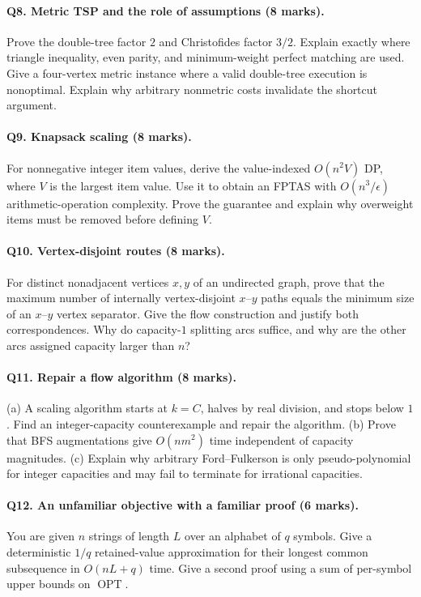 \documentclass[10pt]{article}
\theoremstyle{definition}
\newcommand{\OPT}{\operatorname{OPT}}
\begin{document}
\paragraph{Q8. Metric TSP and the role of assumptions (8 marks).}
Prove the double-tree factor $2$ and Christofides factor $3/2$.  Explain
exactly where triangle inequality, even parity, and minimum-weight perfect
matching are used.  Give a four-vertex metric instance where a valid
double-tree execution is nonoptimal.  Explain why arbitrary nonmetric
costs invalidate the shortcut argument.

\paragraph{Q9. Knapsack scaling (8 marks).}
For nonnegative integer item values, derive the value-indexed $O(n^2V)$ DP,
where $V$ is the largest item value.  Use it to obtain an FPTAS with
$O(n^3/\epsilon)$ arithmetic-operation complexity.  Prove the guarantee
and explain why overweight items must be removed before defining $V$.

\paragraph{Q10. Vertex-disjoint routes (8 marks).}
For distinct nonadjacent vertices $x,y$ of an undirected graph, prove that
the maximum number of internally vertex-disjoint $x$--$y$ paths equals
the minimum size of an $x$--$y$ vertex separator.  Give the flow construction
and justify both correspondences.  Why do capacity-$1$ splitting arcs
suffice, and why are the other arcs assigned capacity larger than $n$?

\paragraph{Q11. Repair a flow algorithm (8 marks).}
(a) A scaling algorithm starts at $k=C$, halves by real division, and stops
below $1$.  Find an integer-capacity counterexample and repair the algorithm.
(b) Prove that BFS augmentations give $O(nm^2)$ time independent of capacity
magnitudes.  (c) Explain why arbitrary Ford--Fulkerson is only
pseudo-polynomial for integer capacities and may fail to terminate for
irrational capacities.

\paragraph{Q12. An unfamiliar objective with a familiar proof (6 marks).}
You are given $n$ strings of length $L$ over an alphabet of $q$ symbols.
Give a deterministic $1/q$ retained-value approximation for their longest
common subsequence in $O(nL+q)$ time.  Give a second proof using a sum of
per-symbol upper bounds on $\OPT$.
\end{document}
